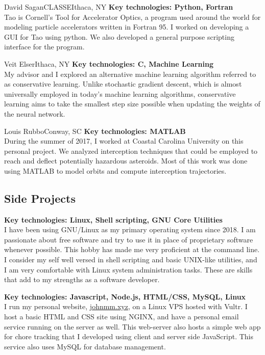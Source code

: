 \documentclass[11pt,a4paper,sans]{moderncv}        %
\newcommand{\techlist}[1]{\textbf{Key technologies: {#1}}\\}
\begin{document}
{David Sagan}{CLASSE}{Ithaca, NY}{
\techlist{Python, Fortran}
Tao is Cornell's Tool for Accelerator Optics, a program used around the world for modeling particle accelerators written in Fortran 95.
I worked on developing a GUI for Tao using python.
We also developed a general purpose scripting interface for the program.
}%

{Veit Elser}{Ithaca, NY}{}{
\techlist{C, Machine Learning}
My advisor and I explored an alternative machine learning algorithm referred to as conservative learning.
Unlike stochastic gradient descent, which is almost universally employed in today's machine learning algorithms, conservative learning aims to take the smallest step size possible when updating the weights of the neural network.
}%

{Louis Rubbo}{Conway, SC}{}{
\techlist{MATLAB}
During the summer of 2017, I worked at Coastal Carolina University on this personal project.
We analyzed interception techniques that could be employed to reach and deflect potentially hazardous asteroids.
Most of this work was done using MATLAB to model orbits and compute interception trajectories.
}%

\subsection{Side Projects}

{}{}{}{
\techlist{Linux, Shell scripting, GNU Core Utilities}
I have been using GNU/Linux as my primary operating system since 2018.
I am passionate about free software and try to use it in place of proprietary software whenever possible.
This hobby has made me very proficient at the command line.
I consider my self well versed in shell scripting and basic UNIX-like utilities, and I am very comfortable with Linux system administration tasks.
These are skills that add to my strengths as a software developer.
}%

{}{}{}{
\techlist{Javascript, Node.js, HTML/CSS, MySQL, Linux}
I run my personal website, \url{johnmm.xyz}, on a Linux VPS hosted with Vultr.
I host a basic HTML and CSS site using NGINX, and have a personal email service running on the server as well.
This web-server also hosts a simple web app for chore tracking that I developed using client and server side JavaScript.
This service also uses MySQL for database management.
}%
\end{document}

